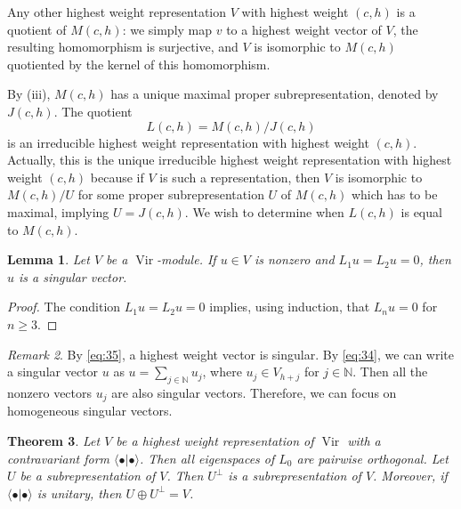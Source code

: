 \documentclass[a4paper, 12pt, reqno]{amsart}
\newtheorem{theorem}{Theorem}[section]
\newtheorem{lemma}[theorem]{Lemma}
\theoremstyle{remark}
\newtheorem{remark}[theorem]{Remark}
\DeclareMathOperator{\Vir}{Vir}
\begin{document}
Any other highest weight representation $V$ with highest weight $(c, h)$ is a quotient of $M(c, h)$: we simply map $v$ to a highest weight vector of $V$, the resulting homomorphism is surjective, and $V$ is isomorphic to $M(c, h)$ quotiented by the kernel of this homomorphism.

By (iii), $M(c, h)$ has a unique maximal proper subrepresentation, denoted by $J(c, h)$.
The quotient
\begin{equation*}
  L(c, h) = M(c, h)/J(c, h)
\end{equation*}
is an irreducible highest weight representation with highest weight $(c, h)$.
Actually, this is the unique irreducible highest weight representation with highest weight $(c, h)$ because if $V$ is such a representation, then $V$ is isomorphic to $M(c, h)/U$ for some proper subrepresentation $U$ of $M(c, h)$ which has to be maximal, implying $U = J(c, h)$.
We wish to determine when $L(c, h)$ is equal to $M(c, h)$.

\begin{lemma}
  \label{lmm:19}
  Let $V$ be a $\Vir$-module.
  If $u \in V$ is nonzero and $L_1u = L_2u = 0$, then $u$ is a singular vector.
\end{lemma}

\begin{proof}
  The condition $L_1u = L_2u = 0$ implies, using induction, that $L_nu = 0$ for $n \ge 3$.
\end{proof}

\begin{remark}
  \label{rmk:28}
  By \eqref{eq:35}, a highest weight vector is singular.
  By \eqref{eq:34}, we can write a singular vector $u$ as $u = \sum_{j \in \mathbb{N}}u_j$, where $u_j \in V_{h + j}$ for $j \in \mathbb{N}$.
  Then all the nonzero vectors $u_j$ are also singular vectors.
  Therefore, we can focus on homogeneous singular vectors.
\end{remark}

\begin{theorem}
  \label{thr:29}
  Let $V$ be a highest weight representation of $\Vir$ with a contravariant form $\langle\bullet| \bullet\rangle$.
  Then all eigenspaces of $L_0$ are pairwise orthogonal.
  Let $U$ be a subrepresentation of $V$.
  Then $U^{\perp}$ is a subrepresentation of $V$.
  Moreover, if $\langle\bullet| \bullet\rangle$ is unitary, then $U \oplus U^{\perp} = V$.
\end{theorem}
\end{document}
